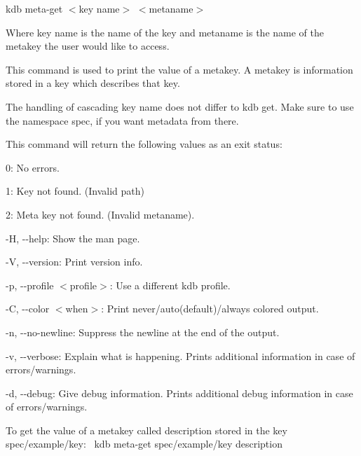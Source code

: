 {\ttfamily kdb meta-\/get $<$key name$>$ $<$metaname$>$}~\newline


Where {\ttfamily key name} is the name of the key and {\ttfamily metaname} is the name of the metakey the user would like to access.

This command is used to print the value of a metakey. A metakey is information stored in a key which describes that key.

The handling of cascading {\ttfamily key name} does not differ to {\ttfamily kdb get}. Make sure to use the namespace {\ttfamily spec}, if you want metadata from there.

This command will return the following values as an exit status\+:~\newline



\begin{DoxyItemize}
\item 0\+: No errors.
\item 1\+: Key not found. (Invalid {\ttfamily path})
\item 2\+: Meta key not found. (Invalid {\ttfamily metaname}).
\end{DoxyItemize}


\begin{DoxyItemize}
\item {\ttfamily -\/H}, {\ttfamily -\/-\/help}\+: Show the man page.
\item {\ttfamily -\/V}, {\ttfamily -\/-\/version}\+: Print version info.
\item {\ttfamily -\/p}, {\ttfamily -\/-\/profile $<$profile$>$}\+: Use a different kdb profile.
\item {\ttfamily -\/C}, {\ttfamily -\/-\/color $<$when$>$}\+: Print never/auto(default)/always colored output.
\item {\ttfamily -\/n}, {\ttfamily -\/-\/no-\/newline}\+: Suppress the newline at the end of the output.
\item {\ttfamily -\/v}, {\ttfamily -\/-\/verbose}\+: Explain what is happening. Prints additional information in case of errors/warnings.
\item {\ttfamily -\/d}, {\ttfamily -\/-\/debug}\+: Give debug information. Prints additional debug information in case of errors/warnings.
\end{DoxyItemize}

To get the value of a metakey called {\ttfamily description} stored in the key {\ttfamily spec/example/key}\+:~\newline
 {\ttfamily kdb meta-\/get spec/example/key description}

